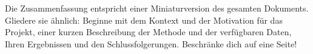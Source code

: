 


\begin{extraAbstract}
\addchaptertocentry{\extraabstractname} %

Die Zusammenfassung entspricht einer Miniaturversion des gesamten Dokuments. Gliedere sie ähnlich: Beginne mit dem Kontext und der Motivation für das Projekt, einer kurzen Beschreibung der Methode und der verfügbaren Daten, Ihren Ergebnissen und den Schlussfolgerungen. Beschränke dich auf eine Seite!    
\end{extraAbstract}
